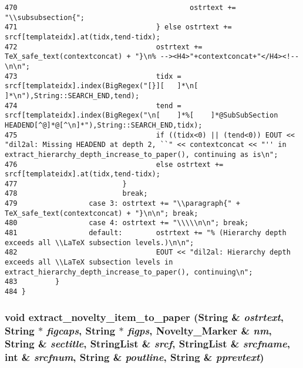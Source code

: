 \begin{verbatim}
470                                         ostrtext += "\\subsubsection{";
471                                 } else ostrtext += srcf[templateidx].at(tidx,tend-tidx);
472                                 ostrtext += TeX_safe_text(contextconcat) + "}\n% --><H4>"+contextconcat+"</H4><!--\n\n";
473                                 tidx = srcf[templateidx].index(BigRegex("[}][   ]*\n[   ]*\n"),String::SEARCH_END,tend);
474                                 tend = srcf[templateidx].index(BigRegex("\n[    ]*%[    ]*@SubSubSection HEADEND[^@]*@[^\n]*"),String::SEARCH_END,tidx);
475                                 if ((tidx<0) || (tend<0)) EOUT << "dil2al: Missing HEADEND at depth 2, ``" << contextconcat << "'' in extract_hierarchy_depth_increase_to_paper(), continuing as is\n";
476                                 else ostrtext += srcf[templateidx].at(tidx,tend-tidx);
477                         }
478                         break;
479                 case 3: ostrtext += "\\paragraph{" + TeX_safe_text(contextconcat) + "}\n\n"; break;
480                 case 4: ostrtext += "\\\\\n\n"; break;
481                 default:        ostrtext += "% (Hierarchy depth exceeds all \\LaTeX subsection levels.)\n\n";
482                                 EOUT << "dil2al: Hierarchy depth exceeds all \\LaTeX subsection levels in extract_hierarchy_depth_increase_to_paper(), continuing\n";
483         }
484 }
\end{verbatim}\normalsize 
{}
\subsubsection{\setlength{\rightskip}{0pt plus 5cm}void extract\_\-novelty\_\-item\_\-to\_\-paper ({\bf String} \& {\em ostrtext}, {\bf String} $\ast$ {\em figcaps}, {\bf String} $\ast$ {\em figps}, {\bf Novelty\_\-Marker} \& {\em nm}, {\bf String} \& {\em sectitle}, {\bf String\-List} \& {\em srcf}, {\bf String\-List} \& {\em srcfname}, int \& {\em srcfnum}, {\bf String} \& {\em poutline}, {\bf String} \& {\em pprevtext})}\label{ppfilter_8cc_a21}




